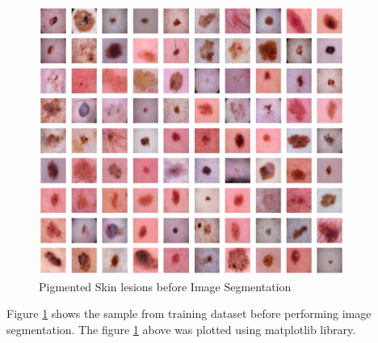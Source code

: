 \begin{figure}[!htb]
	\centering
	\includegraphics[width=10cm]{Images/bseg.png}
	\caption{Pigmented Skin lesions before Image Segmentation}
	\label{fig:before_seg}
\end{figure}

Figure \ref{fig:before_seg} shows the sample from training dataset before performing image segmentation.
The figure \ref{fig:before_seg} above was plotted using matplotlib library.
